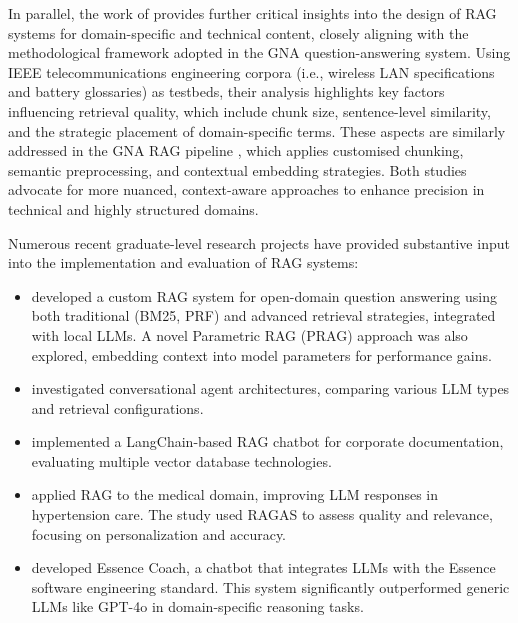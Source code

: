 \begin{spacing}{1.5}
In parallel, the work of \citep{soman_observations_2024} provides further critical insights into the design of RAG systems for domain-specific and technical content, closely aligning with the methodological framework adopted in the GNA question-answering system. Using IEEE telecommunications engineering corpora (i.e., wireless LAN specifications and battery glossaries) as testbeds, their analysis highlights key factors influencing retrieval quality, which include chunk size, sentence-level similarity, and the strategic placement of domain-specific terms. These aspects are similarly addressed in the GNA RAG pipeline \citep{pograri_question-answering_2025}, which applies customised chunking, semantic preprocessing, and contextual embedding strategies. Both studies advocate for more nuanced, context-aware approaches to enhance precision in technical and highly structured domains.

Numerous recent graduate-level research projects have provided substantive input into the implementation and evaluation of RAG systems:
\begin{itemize}
    \item \textcite{antolini_experimental_2025} developed a custom RAG system for open-domain question answering using both traditional (BM25, PRF) and advanced retrieval strategies, integrated with local LLMs. A novel Parametric RAG (PRAG) approach was also explored, embedding context into model parameters for performance gains.
    \item \textcite{caramanna_progettazione_2024} investigated conversational agent architectures, comparing various LLM types and retrieval configurations.
    \item \textcite{florio_progettazione_2024} implemented a LangChain-based RAG chatbot for corporate documentation, evaluating multiple vector database technologies.
    \item \textcite{salcuni_utilizzo_2025} applied RAG to the medical domain, improving LLM responses in hypertension care. The study used RAGAS to assess quality and relevance, focusing on personalization and accuracy.
    \item \textcite{nicoletti_llms_2025} developed Essence Coach, a chatbot that integrates LLMs with the Essence software engineering standard. This system significantly outperformed generic LLMs like GPT-4o in domain-specific reasoning tasks.
\end{itemize}


\end{spacing}
